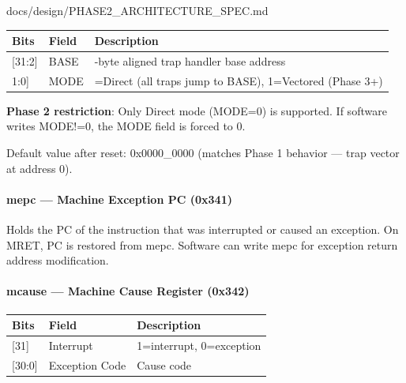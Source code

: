 \begin{relocated}{docs/design/PHASE2_ARCHITECTURE_SPEC.md}
{
\begin{longtable}[]{@{}
  >{\raggedright\arraybackslash}p{}
  >{\raggedright\arraybackslash}p{}
  >{\raggedright\arraybackslash}p{}@{}}
\toprule\noalign{}
\begin{minipage}[b]{\linewidth}\raggedright
Bits
\end{minipage} & \begin{minipage}[b]{\linewidth}\raggedright
Field
\end{minipage} & \begin{minipage}[b]{\linewidth}\raggedright
Description
\end{minipage} \\
\midrule\noalign{}
\endhead
\bottomrule\noalign{}
\endlastfoot
{[}31:2{]} & BASE & 4-byte aligned trap handler base address \\
{[}1:0{]} & MODE & 0=Direct (all traps jump to BASE), 1=Vectored (Phase
3+) \\
\end{longtable}
}

\textbf{Phase 2 restriction}: Only Direct mode (MODE=0) is supported. If
software writes MODE!=0, the MODE field is forced to 0.

Default value after reset: 0x0000\_\allowbreak{}0000 (matches Phase 1
behavior --- trap vector at address 0).

\paragraph{mepc --- Machine Exception PC (0x341)}\label{ds:ch:phase2-architecture:mepc-machine-exception-pc-0x341}

Holds the PC of the instruction that was interrupted or caused an
exception. On MRET, PC is restored from mepc. Software can write mepc
for exception return address modification.

\paragraph{mcause --- Machine Cause Register (0x342)}\label{ds:ch:phase2-architecture:mcause-machine-cause-register-0x342}

{
\begin{longtable}[]{@{}lll@{}}
\toprule\noalign{}
Bits & Field & Description \\
\midrule\noalign{}
\endhead
\bottomrule\noalign{}
\endlastfoot
{[}31{]} & Interrupt & 1=interrupt, 0=exception \\
{[}30:0{]} & Exception Code & Cause code \\
\end{longtable}
}


\end{relocated}

